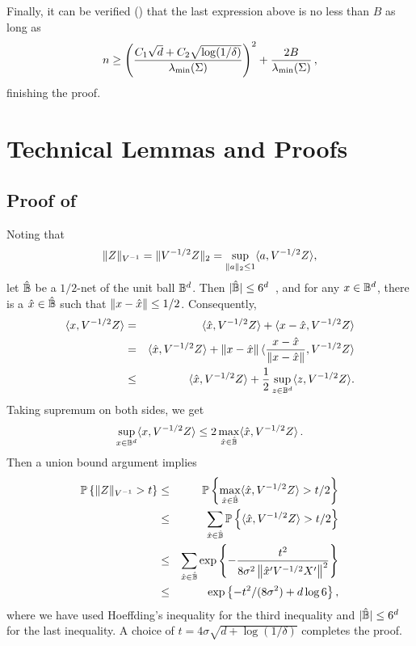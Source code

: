 Finally, it can be verified () that the last expression above is no less than $B$ as long as
\[
n \ge \left(\frac{C_1 \sqrt{d} + C_2 \sqrt{\log(1/\delta)}}{\lambda_{\min}(\Sigma)}\right)^2 + \frac{2B}{\lambda_{\min}(\Sigma)} \,,
\]
finishing the proof.

%

\section{Technical Lemmas and Proofs} \label{sec:lemmas}

\subsection{Proof of }

Noting that 
$$\|Z\|_{V^{-1}}=\|V^{-1/2}Z\|_2 = \sup_{\|a\|_2 \le 1}\langle a, V^{-1/2}Z \rangle,$$
let $\hat{\mathbb{B}}$ be a $1/2$-net of the unit ball $\mathbb{B}^d$. Then $|\hat{\mathbb{B}}| \le 6^d$~\citep[Lemma 4.1]{pollard1990empirical}, and for any $x \in \mathbb{B}^d$, there is a $\hat{x} \in \hat{\mathbb{B}}$ such that $\left\|x-\hat{x}\right\| \le 1/2$. Consequently, 
\begin{eqnarray*} 
\langle x, V^{-1/2}Z \rangle &=& \langle \hat{x}, V^{-1/2}Z \rangle + \langle x-\hat{x}, V^{-1/2}Z \rangle \\
&=& \langle \hat{x}, V^{-1/2}Z \rangle +  \left\|x-\hat{x}\right\| \langle \frac{x-\hat{x}}{\left\|x-\hat{x}\right\|}, V^{-1/2}Z \rangle \\
&\le& \langle \hat{x}, V^{-1/2}Z \rangle + \frac{1}{2} \sup_{z \in \mathbb{B}^d} \langle z, V^{-1/2}Z \rangle.
\end{eqnarray*}
Taking supremum on both sides, we get
$$ \sup_{x \in \mathbb{B}^d} \langle x, V^{-1/2}Z \rangle \le 2 \max_{\hat{x} \in \hat{\mathbb{B}}} \langle \hat{x}, V^{-1/2}Z \rangle\,.$$
Then a union bound argument implies
\begin{eqnarray*}
\mathbb{P}\left\{\|Z\|_{V^{-1}} > t\right\} &\le& \mathbb{P}\left \{ \max_{\hat{x} \in \hat{\mathbb{B}}} \langle \hat{x}, V^{-1/2}Z \rangle > t/2\right\} \\
&\le& \sum_{\hat{x} \in \hat{\mathbb{B}}} \mathbb{P}\left\{ \langle \hat{x}, V^{-1/2}Z \rangle > t/2 \right \} \\
&\le& \sum_{\hat{x} \in \hat{\mathbb{B}}} \exp \left\{ - \frac{t^2}{8\sigma^2 \left\|\hat{x}'V^{-1/2} X'\right\|^2} \right\} \\
&\le& \exp \left\{ - t^2/(8\sigma^2) +  d \log 6 \right\},
\end{eqnarray*}
where we have used Hoeffding's inequality for the third inequality and $|\hat{\mathbb{B}}| \le 6^d$ for the last inequality. A choice of $t=4\sigma \sqrt{d+\log(1/\delta)}$ completes the proof.

